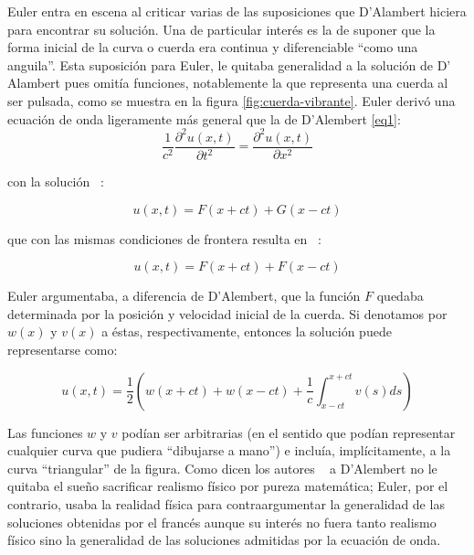 Euler entra en escena al criticar varias de las suposiciones que D'Alambert hiciera para encontrar su solución. Una de particular interés es la de suponer que la forma inicial de la curva o cuerda era continua y diferenciable “como una anguila”. Esta suposición para Euler, le quitaba generalidad a la solución de D' Alambert pues omitía funciones, notablemente la que representa una cuerda al
ser pulsada, como se muestra en la figura \ref{fig:cuerda-vibrante}.
Euler derivó una ecuación de onda ligeramente más general que la de D'Alembert \ref{eq1}:
\begin{equation}\label{eq5}	
	\frac{1}{c^2} \frac{\partial^2 u(x,t)}{\partial t^2} = \frac{\partial^2 u(x,t)}{\partial x^2} 
\end{equation}

con la solución ~\cite{demostracion-onda}:

\begin{equation}\label{eq6}	
	u(x,t) = F(x+ct) + G(x-ct)
\end{equation}

que con las mismas condiciones de frontera resulta en ~\cite{demostracion-onda}:

\begin{equation}\label{eq7}	
	u(x,t) = F(x+ct) + F(x-ct)
\end{equation}


Euler argumentaba, a diferencia de D'Alembert, que la función \( F \) quedaba determinada por la posición y velocidad inicial de la cuerda. Si denotamos por \( w(x) \) y \( v(x) \) a éstas, respectivamente, entonces la solución puede representarse como:


\begin{equation}\label{eq8}	
	u(x,t) = \frac{1}{2} \left( w(x+ct) + w(x-ct) + \frac{1}{c} \int_{x-ct}^{x+ct} v(s) ds \right)
\end{equation}

Las funciones \( w \) y \( v \) podían ser arbitrarias (en el sentido que podían representar cualquier curva que pudiera “dibujarse a mano”) e incluía, implícitamente, a la curva “triangular” de la figura. Como dicen los autores ~\cite{bernoulli_Mechanics} a D'Alembert no le quitaba el sueño sacrificar realismo físico por pureza matemática; Euler, por el contrario, usaba la realidad física para contraargumentar la generalidad de las soluciones obtenidas por el francés aunque su interés no fuera tanto realismo físico sino la generalidad de las soluciones admitidas por la ecuación de onda.

